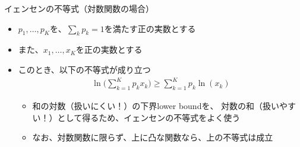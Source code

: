 \documentclass[aspectratio=169,unicode,dvipdfmx,14pt]{beamer}
\begin{document}
\begin{frame}{イェンセンの不等式（対数関数の場合）}
\begin{itemize}
\item $p_1,\ldots,p_K$を、$\sum_k p_k=1$を満たす正の実数とする
\item また、$x_1,\ldots, x_K$を正の実数とする
\item このとき、以下の不等式が成り立つ
\begin{align}
\ln \bigg( \sum_{k=1}^K p_k x_k \bigg) \geq \sum_{k=1}^K p_k \ln(x_k)
\end{align}
\begin{itemize}
\item 和の対数（扱いにくい！）の下界lower boundを、
対数の和（扱いやすい！）として得るため、イェンセンの不等式をよく使う
\item なお、対数関数に限らず、上に凸な関数なら、上の不等式は成立
\end{itemize}
\end{itemize}
\end{frame}
\end{document}
